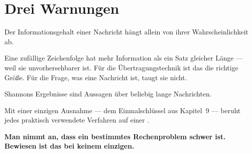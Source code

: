 \section*{Drei Warnungen}

\begin{warnung}
Der Informationsgehalt einer Nachricht hängt allein von ihrer Wahrscheinlichkeit ab.

\begin{center}
\begin{minipage}{0.9\textwidth}
Eine zufällige Zeichenfolge hat mehr Information als ein Satz gleicher Länge --- weil sie unvorhersehbarer ist. Für die Übertragungstechnik ist das die richtige Größe. Für die Frage, was eine Nachricht  ist, taugt sie nicht.
\end{minipage}
\end{center}
\end{warnung}

\begin{warnung}
Shannons Ergebnisse sind Aussagen über beliebig lange Nachrichten.

\begin{center}
\begin{minipage}{0.88\textwidth}
\end{minipage}
\end{center}
\end{warnung}

\begin{warnung}
Mit einer einzigen Ausnahme --- dem Einmalschlüssel aus Kapitel~9 --- beruht jedes praktisch verwendete Verfahren auf einer .

\begin{center}
\begin{minipage}{0.9\textwidth}
\textbf{Man nimmt an, dass ein bestimmtes Rechenproblem schwer ist. Bewiesen ist das bei keinem einzigen.}
\end{minipage}
\end{center}

\begin{center}
\begin{minipage}{0.88\textwidth}
\end{minipage}
\end{center}
\end{warnung}

